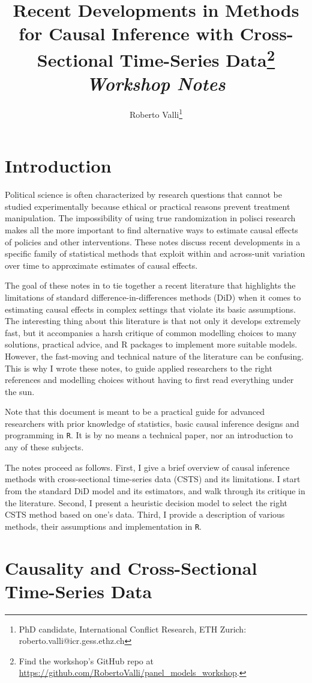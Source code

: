 \documentclass[hidelinks]{article}\usepackage[]{graphicx}\usepackage[]{color}
\author{
	Roberto Valli\thanks{PhD candidate, International Conflict Research, ETH Zurich: roberto.valli@icr.gess.ethz.ch} 
}
\title{
	 Recent Developments in Methods for Causal Inference with Cross-Sectional Time-Series Data\thanks{Find the workshop's GitHub repo at \url{https://github.com/RobertoValli/panel_models_workshop}.}\\[1em]
	 \textit{Workshop Notes}
}
\begin{document}
\maketitle

\section{Introduction}

Political science is often characterized by research questions that cannot be studied experimentally because ethical or practical reasons prevent treatment manipulation. The impossibility of using true randomization in polisci research makes all the more important to find alternative ways to estimate causal effects of policies and other interventions. These notes discuss recent developments in a specific family of statistical methods that exploit within and across-unit variation over time to approximate estimates of causal effects. 

The goal of these notes in to tie together a recent literature that highlights the limitations of standard difference-in-differences methods (DiD) when it comes to estimating causal effects in complex settings that violate its basic assumptions. The interesting thing about this literature is that not only it develops extremely fast, but it accompanies a harsh critique of common modelling choices to many solutions, practical advice, and R packages to implement more suitable models. However, the fast-moving and technical nature of the literature can be confusing. This is why I wrote these notes, to guide applied researchers to the right references and modelling choices without having to first read everything under the sun.

Note that this document is meant to be a practical guide for advanced researchers with prior knowledge of statistics, basic causal inference designs and programming in \texttt{R}. It is by no means a technical paper, nor an introduction to any of these subjects.

The notes proceed as follows. First, I give a brief overview of causal inference methods with cross-sectional time-series data (CSTS) and its limitations. I start from the standard DiD model and its estimators, and walk through its critique in the literature. Second, I present a heuristic decision model to select the right CSTS method based on one's data. Third, I provide a description of various methods, their assumptions and implementation in \texttt{R}.

\section{Causality and Cross-Sectional Time-Series Data}
\end{document}
